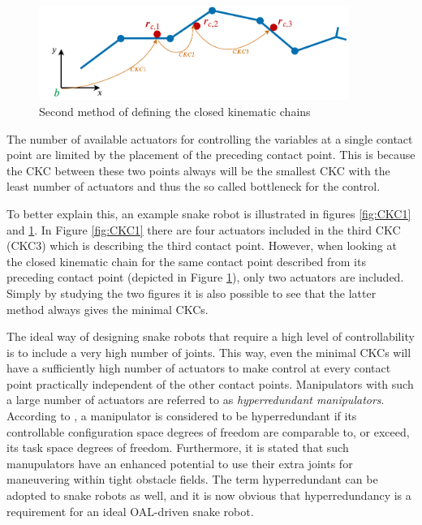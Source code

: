 \begin{figure}
    \centering
    \includegraphics[width=0.9\textwidth]{figures/theory/CKC2.pdf}
    \caption{Second method of defining the closed kinematic chains}
    \label{fig:CKC2}
\end{figure}

The number of available actuators for controlling the variables at a single contact point are limited by the placement of the preceding contact point. This is because the CKC between these two points always will be the smallest CKC with the least number of actuators and thus the so called bottleneck for the control.

To better explain this, an example snake robot is illustrated in figures \ref{fig:CKC1} and \ref{fig:CKC2}. In Figure \ref{fig:CKC1} there are four actuators included in the third CKC (CKC3) which is describing the third contact point. However, when looking at the closed kinematic chain for the same contact point described from its preceding contact point (depicted in Figure \ref{fig:CKC2}), only two actuators are included. Simply by studying the two figures it is also possible to see that the latter method always gives the minimal CKCs.

The ideal way of designing snake robots that require a high level of controllability is to include a very high number of joints. This way, even the minimal CKCs will have a sufficiently high number of actuators to make control at every contact point practically independent of the other contact points. Manipulators with such a large number of actuators are referred to as \textit{hyperredundant manipulators}. According to \cite{chiaverini2008kinematically}, a manipulator is considered to be hyperredundant if its controllable configuration space degrees of freedom are comparable to, or exceed, its task space degrees of freedom. Furthermore, it is stated that such manupulators have an enhanced potential to use their extra joints for maneuvering within tight obstacle fields. The term hyperredundant can be adopted to snake robots as well, and it is now obvious that hyperredundancy is a requirement for an ideal OAL-driven snake robot.


